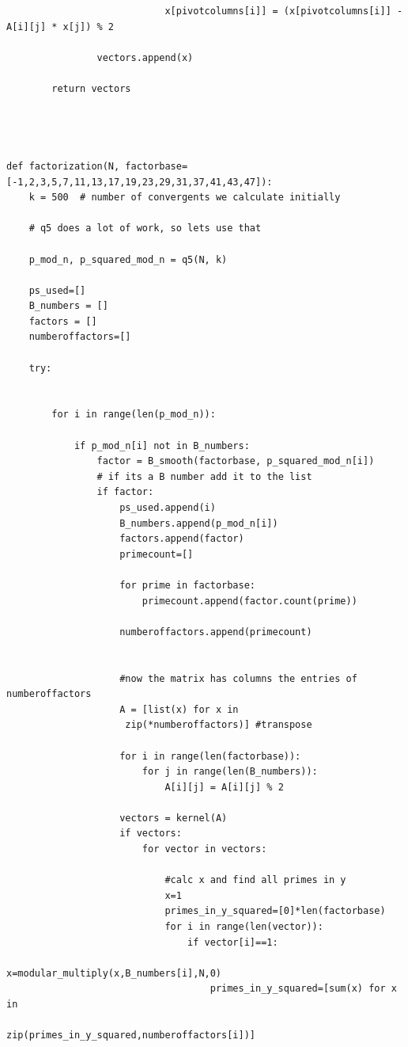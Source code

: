 \documentclass[10pt,a4paper]{report}
\begin{document}
\begin{verbatim}
                            x[pivotcolumns[i]] = (x[pivotcolumns[i]] - A[i][j] * x[j]) % 2

                vectors.append(x)

        return vectors




def factorization(N, factorbase=[-1,2,3,5,7,11,13,17,19,23,29,31,37,41,43,47]):
    k = 500  # number of convergents we calculate initially

    # q5 does a lot of work, so lets use that

    p_mod_n, p_squared_mod_n = q5(N, k)

    ps_used=[]
    B_numbers = []
    factors = []
    numberoffactors=[]

    try:


        for i in range(len(p_mod_n)):

            if p_mod_n[i] not in B_numbers:
                factor = B_smooth(factorbase, p_squared_mod_n[i])
                # if its a B number add it to the list
                if factor:
                    ps_used.append(i)
                    B_numbers.append(p_mod_n[i])
                    factors.append(factor)
                    primecount=[]

                    for prime in factorbase:
                        primecount.append(factor.count(prime))

                    numberoffactors.append(primecount)


                    #now the matrix has columns the entries of numberoffactors
                    A = [list(x) for x in
                     zip(*numberoffactors)] #transpose

                    for i in range(len(factorbase)):
                        for j in range(len(B_numbers)):
                            A[i][j] = A[i][j] % 2

                    vectors = kernel(A)
                    if vectors:
                        for vector in vectors:

                            #calc x and find all primes in y
                            x=1
                            primes_in_y_squared=[0]*len(factorbase)
                            for i in range(len(vector)):
                                if vector[i]==1:
                                    x=modular_multiply(x,B_numbers[i],N,0)
                                    primes_in_y_squared=[sum(x) for x in 
                                    zip(primes_in_y_squared,numberoffactors[i])]




\end{verbatim}
\end{document}
